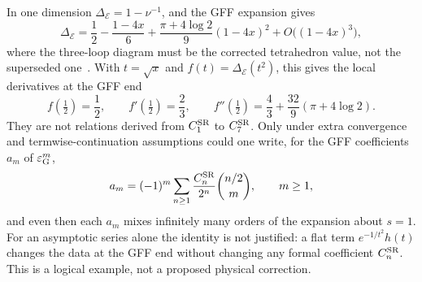 \documentclass[11pt,a4paper]{article}
\numberwithin{equation}{section}
\newcommand{\De}{\Delta_{\mathcal E}}
\newcommand{\CSR}{C^{\rm SR}}
\begin{document}
In one dimension $\De=1-\nu^{-1}$, and the GFF expansion gives
\begin{equation}
 \De=\frac12-\frac{1-4x}{6}+\frac{\pi+4\log2}{9}(1-4x)^2+O\bigl((1-4x)^3\bigr),
\end{equation}
where the three-loop diagram must be the corrected tetrahedron value, not the superseded
one~\cite{Benedetti:2020rrq,Benedetti:2024mqx}. With $t=\sqrt x$ and $f(t)=\De(t^2)$, this gives the local derivatives
at the GFF end
\begin{equation}
 f(\tfrac12)=\frac12,\qquad f'(\tfrac12)=\frac23,\qquad f''(\tfrac12)=\frac43+\frac{32}{9}(\pi+4\log2).
\end{equation}
They are not relations derived from $\CSR_1$ to $\CSR_7$. Only under extra convergence and termwise-continuation
assumptions could one write, for the GFF coefficients $a_m$ of $\varepsilon_{\rm G}^m$,
\begin{equation}
 a_m=(-1)^m\sum_{n\ge1}\frac{\CSR_n}{2^n}\binom{n/2}{m},\qquad m\ge1,
\end{equation}
and even then each $a_m$ mixes infinitely many orders of the expansion about $s=1$. For an asymptotic series alone the
identity is not justified: a flat term $e^{-1/t^2}h(t)$ changes the data at the GFF end without changing any formal
coefficient $\CSR_n$. This is a logical example, not a proposed physical correction.
\end{document}

